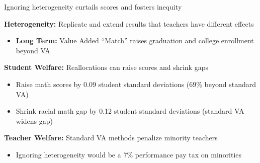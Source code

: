 \documentclass[t,aspectratio=169,11pt]{beamer}
\begin{document}

\begin{frame}{Ignoring heterogeneity curtails scores and fosters inequity}

    \vfill        
    \begin{wideitemize}
        \item {\textbf{Heterogeneity:}} Replicate and extend results that teachers have different effects
        {\tiny \color{gray}\citep{lockwood2009,condie2014teacher,bates2022teacher}}
            \begin{itemize}
                \item<2-> {\textbf{Long Term:}} Value Added ``Match'' raises graduation and college enrollment beyond VA
            \end{itemize}
        
        \item<3-> {\textbf{Student Welfare:}} Reallocations can raise scores and shrink gaps 
            \begin{itemize}
                \item  Raise math scores by 0.09 student standard deviations (69\% beyond standard VA)
                
                \item  Shrink racial math gap by 0.12 student standard deviations (standard VA widens gap)
                
            
            \end{itemize}
        
        \item<4-> {\textbf{Teacher Welfare:}} Standard VA methods penalize minority teachers
            \begin{itemize}
                \item Ignoring heterogeneity would be a 7\% performance pay tax on minorities
            \end{itemize}
    \end{wideitemize}
    \vfill

\end{frame}
\end{document}
